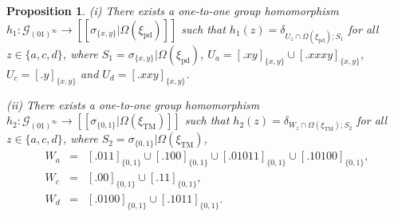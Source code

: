 \documentclass[10pt,a4paper]{amsart}
\newtheorem{proposition}{Proposition}
\def\Om{\Omega}
\def\cG{\mathcal{G}}
\def\de{\delta}
\def\si{\sigma}
\def\xiTM{\xi_{\mathrm{TM}}}
\def\xipd{\xi_{\mathrm{pd}}}
\begin{document}
\begin{proposition}\label{two-more-inj}
(i) There exists a one-to-one group homomorphism $h_1:\cG_{(01)^\infty}\to 
[[\si_{\{x,y\}}|\Om(\xipd)]]$ such that 
$h_1(z)=\de_{U_z\cap\Om(\xipd);S_1}$ for all $z\in\{a,c,d\}$, where 
$S_1=\si_{\{x,y\}}|\Om(\xipd)$, $U_a=[.xy]_{\{x,y\}}\cup [.xxxy]_{\{x,y\}}$,
$U_c=[.y]_{\{x,y\}}$ and $U_d=[.xxy]_{\{x,y\}}$.

(ii) There exists a one-to-one group homomorphism $h_2:\cG_{(01)^\infty}\to 
[[\si_{\{0,1\}}|\Om(\xiTM)]]$ such that 
$h_2(z)=\de_{W_z\cap\Om(\xiTM);S_2}$ for all $z\in\{a,c,d\}$, where 
$S_2=\si_{\{0,1\}}|\Om(\xiTM)$,
\begin{eqnarray*}
W_a &=& [.011]_{\{0,1\}}\cup [.100]_{\{0,1\}}\cup [.01011]_{\{0,1\}}\cup 
[.10100]_{\{0,1\}},\\
W_c &=& [.00]_{\{0,1\}}\cup [.11]_{\{0,1\}},\\
W_d &=& [.0100]_{\{0,1\}}\cup [.1011]_{\{0,1\}}.
\end{eqnarray*}
\end{proposition}
\end{document}
